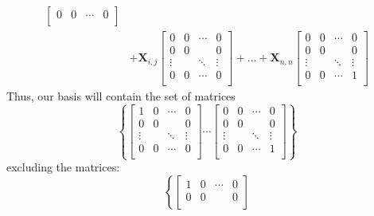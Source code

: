 \begin{enumerate}[label=(\alph*)]
\begin{tcolorbox}
$$\begin{aligned}
\begin{bmatrix}
					      0      & 0 & \cdots & 0      \\
				      \end{bmatrix} \\
				                 & +
				      \mathbf{X}_{i,j}
				      \begin{bmatrix}
					      0      & 0 & \cdots & 0      \\
					      0      & 0 &        & 0      \\
					      \vdots &   & \ddots & \vdots \\
					      0      & 0 & \cdots & 0      \\
				      \end{bmatrix}
				      +
				      \ldots
				      +
				      \mathbf{X}_{n,n}
				      \begin{bmatrix}
					      0      & 0 & \cdots & 0      \\
					      0      & 0 &        & 0      \\
					      \vdots &   & \ddots & \vdots \\
					      0      & 0 & \cdots & 1      \\
				      \end{bmatrix}
			      \end{aligned}
		      $$
		      Thus, our basis will contain the set of matrices
		      $$
			      \left\{
			      \begin{bmatrix}
				      1      & 0 & \cdots & 0      \\
				      0      & 0 &        & 0      \\
				      \vdots &   & \ddots & \vdots \\
				      0      & 0 & \cdots & 0      \\
			      \end{bmatrix}
			      \cdots
			      \begin{bmatrix}
				      0      & 0 & \cdots & 0      \\
				      0      & 0 &        & 0      \\
				      \vdots &   & \ddots & \vdots \\
				      0      & 0 & \cdots & 1      \\
			      \end{bmatrix}
			      \right\}
		      $$
		      excluding the matrices:
		      $$
			      \left\{
			      \begin{bmatrix}
				      1      & 0 & \cdots & 0      \\
				      0      & 0 &        & 0      \\

\end{bmatrix}$$
\end{tcolorbox}
\end{enumerate}

